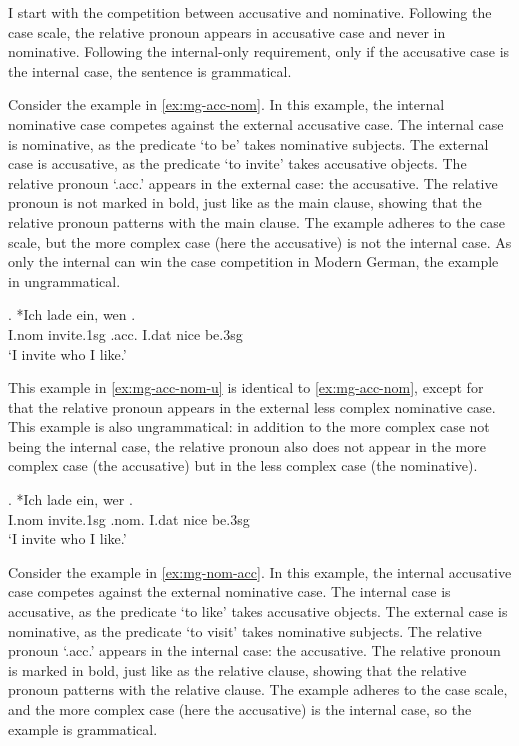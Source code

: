 I start with the competition between accusative and nominative. Following the case scale, the relative pronoun appears in accusative case and never in nominative. Following the internal-only requirement, only if the accusative case is the internal case, the sentence is grammatical.

Consider the example in \ref{ex:mg-acc-nom}. In this example, the internal nominative case competes against the external accusative case.
The internal case is nominative, as the predicate  `to be' takes nominative subjects.
The external case is accusative, as the predicate  `to invite' takes accusative objects.
The relative pronoun  `.\ac{acc}.' appears in the external case: the accusative. The relative pronoun is not marked in bold, just like as the main clause, showing that the relative pronoun patterns with the main clause.
The example adheres to the case scale, but the more complex case (here the accusative) is not the internal case. As only the internal can win the case competition in Modern German, the example in ungrammatical.

\exg. *Ich {lade ein}, wen   .\\
I.\ac{nom} invite.1\ac{sg}\scsub{[acc]} .\ac{acc}. I.\ac{dat} nice be.3\ac{sg}\scsub{[nom]}\\
`I invite who I like.' \label{ex:mg-acc-nom}

This example in \ref{ex:mg-acc-nom-u} is identical to \ref{ex:mg-acc-nom}, except for that the relative pronoun appears in the external less complex nominative case. This example is also ungrammatical: in addition to the more complex case not being the internal case, the relative pronoun also does not appear in the more complex case (the accusative) but in the less complex case (the nominative).

\exg. *Ich {lade ein}, wer   .\\
I.\ac{nom} invite.1\ac{sg}\scsub{[acc]} .\ac{nom}. I.\ac{dat} nice be.3\ac{sg}\scsub{[nom]}\\
`I invite who I like.' \label{ex:mg-acc-nom-u}

Consider the example in \ref{ex:mg-nom-acc}. In this example, the internal accusative case competes against the external nominative case.
The internal case is accusative, as the predicate  `to like' takes accusative objects.
The external case is nominative, as the predicate  `to visit' takes nominative subjects.
The relative pronoun  `.\ac{acc}.' appears in the internal case: the accusative. The relative pronoun is marked in bold, just like as the relative clause, showing that the relative pronoun patterns with the relative clause.
The example adheres to the case scale, and the more complex case (here the accusative) is the internal case, so the example is grammatical.

